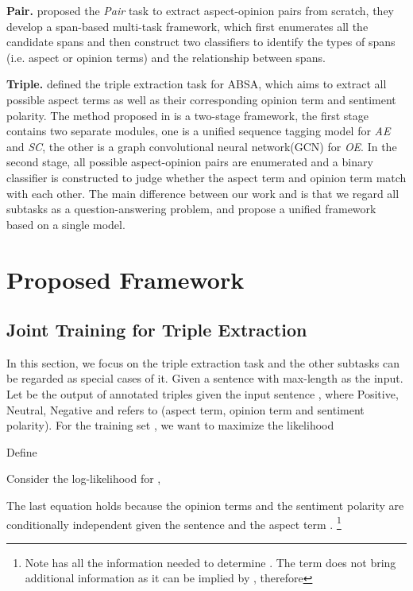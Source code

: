 \documentclass[letterpaper]{article} \usepackage{aaai21}  \usepackage{times}  \usepackage{helvet} \usepackage{courier}  \usepackage[hyphens]{url}  \usepackage{graphicx} \urlstyle{rm} \def\UrlFont{\rm}  \usepackage{natbib}  \usepackage{caption}
\begin{document}
\textbf{Pair.}  \citet{ZhaoHZLX20} proposed the \emph{Pair} task to extract aspect-opinion pairs from scratch, they develop a span-based multi-task framework, 
which first enumerates all the candidate spans and then construct two classifiers to identify the types of spans (i.e. aspect or opinion terms) and the relationship between spans.  	

\textbf{Triple.}  \citet{peng2020knowing} defined the triple extraction task for ABSA, which aims to extract all possible aspect terms as well as their corresponding opinion term and sentiment polarity.  
The method proposed in  \cite{peng2020knowing} is a two-stage framework, the first stage contains two separate modules, one is a unified sequence tagging model for \emph{AE} and \emph{SC}, the other is a graph convolutional neural network(GCN) for \emph{OE}. 
In the second stage, all possible aspect-opinion pairs are enumerated and a binary classifier is constructed to judge whether the aspect term and opinion term match with each other.  
The main difference between our work and  \cite{peng2020knowing} is that we regard all subtasks as a question-answering problem, and propose a unified framework based on a single model. 




\section{Proposed Framework}
\subsection{Joint Training for Triple Extraction}
In this section, we focus on the triple extraction task and the other subtasks can be regarded as special cases of it.
Given a sentence  with max-length  as the input. 
Let   be the output of annotated triples given the input sentence , where 
Positive, Neutral, Negative and  refers to (aspect term, opinion term and sentiment polarity). 
For the training set  , we want to maximize the likelihood 

Define 

Consider the log-likelihood for ,

The last equation holds because the opinion terms  and the sentiment polarity  are conditionally independent  
given the sentence  and the aspect term .
\footnote{Note  has all the information needed to determine . The term  does not bring additional information as it can be implied by ,
therefore }
\end{document}
